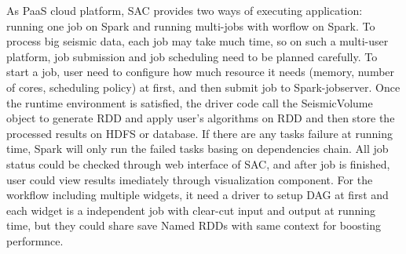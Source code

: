 As PaaS cloud platform, SAC provides two ways of executing application: running one job on Spark and running multi-jobs with worflow on Spark. To process big seismic data, each job may take much time, so on such a multi-user platform, job submission and job scheduling need to be planned carefully. To start a job, user need to configure how much resource it needs (memory, number of cores, scheduling policy) at first, and then submit job to Spark-jobserver. Once the runtime environment is satisfied, the driver code call the SeismicVolume object to generate RDD and apply user's algorithms on RDD and then store the processed results on HDFS or database. If there are any tasks failure at running time, Spark will only run the failed tasks basing on dependencies chain. All job status could be checked through web interface of SAC, and after job is finished, user could view results imediately through visualization component. For the workflow including multiple widgets, it need a driver to setup DAG at first and each widget is a independent job with clear-cut input and output at running time, but they could share save Named RDDs with same context for boosting performnce.


